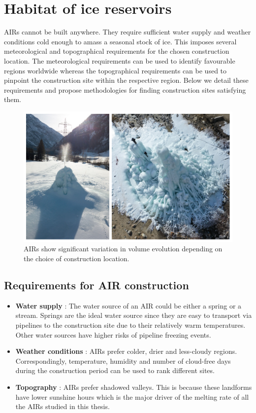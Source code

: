 \chapter{Habitat of ice reservoirs}

AIRs cannot be built anywhere. They require sufficient water supply and weather conditions cold enough to
amass a seasonal stock of ice. This imposes several meteorological and topographical requirements for the chosen
construction location. The meteorological requirements can be used to identify favourable regions worldwide
whereas the topographical requirements can be used to pinpoint the construction site within the respective
region. Below we detail these requirements and propose methodologies for finding construction sites satisfying
them. 

\begin{figure}[t]
\centering
\includegraphics[width=12cm]{Figures/2AIRs.jpg}
\caption{AIRs show significant variation in volume evolution depending on the choice of construction location.}
\label{fig:2AIRs}
\end{figure}

\section{Requirements for AIR construction}

\begin{itemize}
  \item {\bf Water supply} : The water source of an AIR could be either a spring or a stream. Springs are the ideal
    water source since they are easy to transport via pipelines to the construction site due to their relatively
    warm temperatures. Other water sources have higher risks of pipeline freezing events. 

  \item {\bf Weather conditions} : AIRs prefer colder, drier and less-cloudy regions. Correspondingly,
    temperature, humidity and number of cloud-free days during the construction period can be used to rank
    different sites. 

  \item {\bf Topography} : AIRs prefer shadowed valleys. This is because these landforms have lower sunshine
    hours which is the major driver of the melting rate of all the AIRs studied in this thesis.

\end{itemize}


